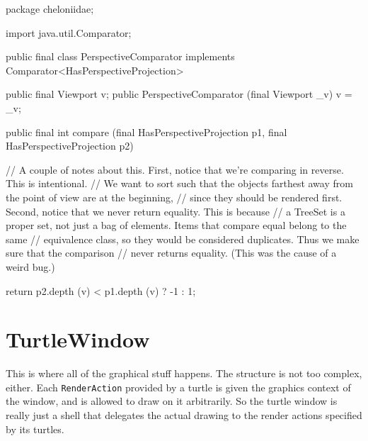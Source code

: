 \documentclass{report}
\begin{document}
\begin{javacode}
package cheloniidae;

import java.util.Comparator;

public final class PerspectiveComparator implements Comparator<HasPerspectiveProjection> {
  public final Viewport v;
  public PerspectiveComparator (final Viewport _v) {v = _v;}

  public final int compare (final HasPerspectiveProjection p1, final HasPerspectiveProjection p2) {
    // A couple of notes about this. First, notice that we're comparing in reverse. This is intentional.
    // We want to sort such that the objects farthest away from the point of view are at the beginning,
    // since they should be rendered first. Second, notice that we never return equality. This is because
    // a TreeSet is a proper set, not just a bag of elements. Items that compare equal belong to the same
    // equivalence class, so they would be considered duplicates. Thus we make sure that the comparison
    // never returns equality. (This was the cause of a weird bug.)

    return p2.depth (v) < p1.depth (v) ? -1 : 1;
  }
}
\end{javacode}

\section {TurtleWindow} \label{sec:turtlewindow}
      This is where all of the graphical stuff happens. The structure is not too complex, either. Each {\tt RenderAction} provided by a turtle is given the
      graphics context of the window, and is allowed to draw on it arbitrarily. So the turtle window is really just a shell that delegates the actual drawing to
      the render actions specified by its turtles.
\end{document}
